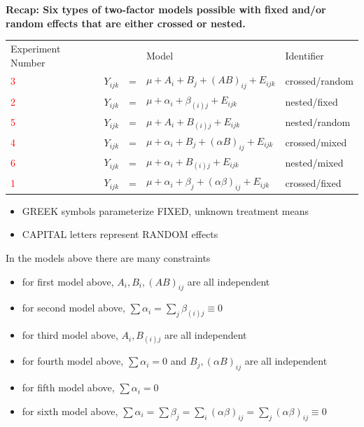 \textbf{Recap:  Six types of two-factor models possible with fixed and/or random effects that are either crossed or nested.}
\begin{center}
\begin{tabular}{l|ccl|l}
Experiment Number & && Model & Identifier\\
\textcolor{red}{3}
& $Y_{ijk}$&=&$\mu + A_i + B_j + (AB)_{ij} + E_{ijk}$  & \mbox{crossed/random} \\
\textcolor{red}{2}
& $Y_{ijk}$&=&$\mu + \alpha_i + \beta_{(i)j} + E_{ijk}$ &  \mbox{nested/fixed} \\
\textcolor{red}{5}
& $Y_{ijk}$&=&$\mu + A_i + B_{(i)j} + E_{ijk}$  & \mbox{nested/random} \\
\textcolor{red}{4}
& $Y_{ijk}$&=&$\mu + \alpha_i + B_j + (\alpha B)_{ij} + E_{ijk}$  & \mbox{crossed/mixed} \\
\textcolor{red}{6}
& $Y_{ijk}$&=&$\mu + \alpha_i + B_{(i)j} + E_{ijk}$  & \mbox{nested/mixed} \\
\textcolor{red}{1}
& $Y_{ijk}$&=&$\mu + \alpha_i + \beta_j + (\alpha\beta)_{ij} + E_{ijk}$ & \mbox{crossed/fixed} \\
\end{tabular}
\end{center}

\begin{itemize}
\item GREEK symbols parameterize FIXED, unknown treatment means 
\item CAPITAL letters represent RANDOM effects
\end{itemize}
In the models above there are many constraints
\begin{itemize}
\item for first model above, $A_i,B_i,(AB)_{ij}$ are all independent
\item for second model above, $\sum \alpha_i = \sum_j \beta_{(i)j} \equiv  0$
\item for third model above, $A_i,B_{(i)j}$ are all independent
\item for fourth model above, $\sum \alpha_i=0$ and $B_j,(\alpha B)_{ij}$ are all independent
\item for fifth model above, $\sum \alpha_i=0$ 
\item for sixth model above, $\sum \alpha_i = \sum \beta_j = \sum_i (\alpha\beta)_{ij} = \sum_j (\alpha\beta)_{ij} \equiv 0$
\end{itemize}

